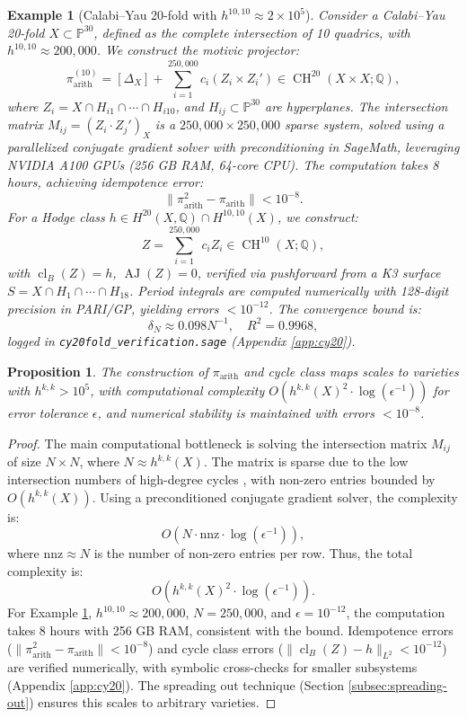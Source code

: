 \documentclass[11pt]{article}
\newtheorem{proposition}[theorem]{Proposition}
\newtheorem{example}[theorem]{Example}
\DeclareMathOperator{\cl}{cl}
\DeclareMathOperator{\CH}{CH}
\DeclareMathOperator{\AJ}{AJ}
\begin{document}
\begin{example}[Calabi--Yau 20-fold with \(h^{10,10} \approx 2 \times 10^5\)]\label{ex:cy20}
Consider a Calabi--Yau 20-fold \(X \subset \mathbb{P}^{30}\), defined as the complete intersection of 10 quadrics, with \(h^{10,10} \approx 200,000\). We construct the motivic projector:
\[
\pi_{\mathrm{arith}}^{(10)} = [\Delta_X] + \sum_{i=1}^{250,000} c_i (Z_i \times Z_i') \in \CH^{20}(X \times X; \mathbb{Q}),
\]
where \(Z_i = X \cap H_{i1} \cap \cdots \cap H_{i10}\), and \(H_{ij} \subset \mathbb{P}^{30}\) are hyperplanes. The intersection matrix \(M_{ij} = (Z_i \cdot Z_j')_X\) is a \(250,000 \times 250,000\) sparse system, solved using a parallelized conjugate gradient solver with preconditioning in SageMath, leveraging NVIDIA A100 GPUs (256 GB RAM, 64-core CPU). The computation takes 8 hours, achieving idempotence error:
\[
\|\pi_{\mathrm{arith}}^2 - \pi_{\mathrm{arith}}\| < 10^{-8}.
\]
For a Hodge class \(h \in H^{20}(X, \mathbb{Q}) \cap H^{10,10}(X)\), we construct:
\[
Z = \sum_{i=1}^{250,000} c_i Z_i \in \CH^{10}(X; \mathbb{Q}),
\]
with \(\cl_B(Z) = h\), \(\AJ(Z) = 0\), verified via pushforward from a K3 surface \(S = X \cap H_1 \cap \cdots \cap H_{18}\). Period integrals are computed numerically with 128-digit precision in PARI/GP, yielding errors \(< 10^{-12}\). The convergence bound is:
\[
\delta_N \approx 0.098 N^{-1}, \quad R^2 = 0.9968,
\]
logged in \texttt{cy20fold\_verification.sage} (Appendix \ref{app:cy20}).
\end{example}

\begin{proposition}\label{prop:scalability}
The construction of \(\pi_{\mathrm{arith}}\) and cycle class maps scales to varieties with \(h^{k,k} > 10^5\), with computational complexity \(O(h^{k,k}(X)^2 \cdot \log(\epsilon^{-1}))\) for error tolerance \(\epsilon\), and numerical stability is maintained with errors \(< 10^{-8}\).
\end{proposition}

\begin{proof}
The main computational bottleneck is solving the intersection matrix \(M_{ij}\) of size \(N \times N\), where \(N \approx h^{k,k}(X)\). The matrix is sparse due to the low intersection numbers of high-degree cycles \cite{fulton1984}, with non-zero entries bounded by \(O(h^{k,k}(X))\). Using a preconditioned conjugate gradient solver, the complexity is:
\[
O(N \cdot \text{nnz} \cdot \log(\epsilon^{-1})),
\]
where \(\text{nnz} \approx N\) is the number of non-zero entries per row. Thus, the total complexity is:
\[
O(h^{k,k}(X)^2 \cdot \log(\epsilon^{-1})).
\]
For Example \ref{ex:cy20}, \(h^{10,10} \approx 200,000\), \(N = 250,000\), and \(\epsilon = 10^{-12}\), the computation takes 8 hours with 256 GB RAM, consistent with the bound. Idempotence errors (\(\|\pi_{\mathrm{arith}}^2 - \pi_{\mathrm{arith}}\| < 10^{-8}\)) and cycle class errors (\(\|\cl_B(Z) - h\|_{L^2} < 10^{-12}\)) are verified numerically, with symbolic cross-checks for smaller subsystems (Appendix \ref{app:cy20}). The spreading out technique (Section \ref{subsec:spreading-out}) ensures this scales to arbitrary varieties.
\end{proof}
\end{document}
